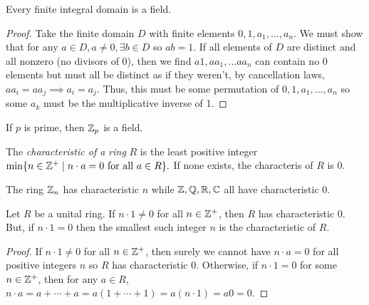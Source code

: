 \begin{theorem}
    Every finite integral domain is a field.
\end{theorem}
\begin{proof}
    Take the finite domain $D$ with finite elements $0, 1, a_1, \ldots, a_n$. We must show that for any $a \in D, a \neq 0, \exists b \in D$ so $ab =1$. If all elements of $D$ are distinct and all nonzero (no divisors of 0), then we find $a1, aa_1, \ldots aa_n$ can contain no 0 elements but must all be distinct as if they weren't, by cancellation laws, $aa_i = aa_j \implies a_i = a_j$. Thus, this must be some permutation of $0, 1, a_1, \ldots, a_n$ so some $a_k$ must be the multiplicative inverse of 1.
\end{proof}
\begin{corollary}
    If $p$ is prime, then $\mathbb{Z}_p$ is a field.
\end{corollary}
\begin{definition}
    The \emph{characteristic of a ring} $R$ is the least positive integer $\min\{n \in \mathbb{Z}^+ \mid n\cdot a = 0 \text{ for all } a \in R\}.$ If none exists, the characteris of $R$ is 0.
\end{definition}
\begin{example}
    The ring $\mathbb{Z}_n$ has characteristic $n$ while $\mathbb{Z}, \mathbb{Q}, \mathbb{R}, \mathbb{C}$ all have characteristic 0.
\end{example}
\begin{theorem}
    Let $R$ be a unital ring. If $n \cdot 1 \neq 0$ for all $n \in \mathbb{Z}^+$, then $R$ has characteristic 0. But, if $n \cdot 1 = 0$ then the smallest such integer $n$ is the characteristic of $R$.
\end{theorem}
\begin{proof}
    If $n \cdot 1 \neq 0$ for all $n \in \mathbb{Z}^+$, then surely we cannot have $n \cdot a = 0$ for all positive integers $n$ so $R$ has characteristic 0. Otherwise, if $n \cdot 1 = 0$ for some $n \in \mathbb{Z}^+$, then for any $a \in R$, $n \cdot a = a + \cdots + a = a(1 + \cdots + 1) = a(n \cdot 1) = a0 = 0.$
\end{proof}






